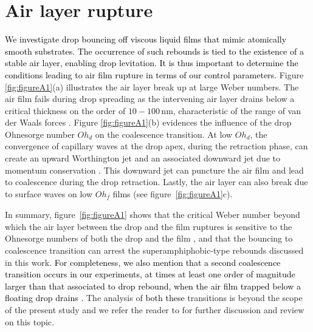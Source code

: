 \documentclass[]{jfm}
\newcommand{\revRev}[1]{\textcolor{black}{#1}}
\newcommand{\Ohd}{\mathit{Oh}_\mathit{d}}
\newcommand{\Ohf}{\mathit{Oh}_\mathit{f}}
\begin{document}
\section{Air layer rupture}
\label{App:FilmRupture}
%
\revRev{We investigate drop bouncing off viscous liquid films that mimic atomically smooth substrates. The occurrence of such rebounds is tied to the existence of a stable air layer, enabling drop levitation. It is thus important to determine the conditions leading to air film rupture in terms of our control parameters.}
Figure \ref{fig:figureA1}(a) illustrates the air layer break up at large Weber numbers. The air film fails during drop spreading as the intervening air layer drains below a critical thickness on the order of $10 - 100\,\si{\nano\meter}$, characteristic of the range of van der Waals forces \citep{charles1960coalescence, SprittlesPhysRevLett.124.084501, zhang2021thin}.
Figure \ref{fig:figureA1}(b) evidences the influence of the drop Ohnesorge number $\Ohd$ on the coalescence transition. 
At low $\Ohd$, the convergence of capillary waves at the drop apex, during the retraction phase, can create an upward Worthington jet and an associated downward jet due to momentum conservation \citep{Bartolo2006Singular,lee2020downward,zhang2022impact}. 
This downward jet can puncture the air film and lead to coalescence during the drop retraction.
Lastly, the air layer can also break due to surface waves on low $\Ohf$ films (see figure~\ref{fig:figureA1}c). 

In summary, figure~\ref{fig:figureA1} shows that the critical Weber number beyond which the air layer between the drop and the film ruptures is sensitive to the Ohnesorge numbers of both the drop and the film \citep{tang2016nonmonotonic, tang2018bouncing}, and that the bouncing to coalescence transition can arrest the superamphiphobic-type rebounds discussed in this work.
\revRev{For completeness, we also mention that a second coalescence transition occurs in our experiments, at times at least one order of magnitude larger than that associated to drop rebound, when the air film trapped below a floating drop drains \citep{lo2017mechanism,duchemin2020dimple}.}
The analysis of \revRev{both these} transitions is beyond the scope of the present study and we refer the reader to \citet{lohse-2020-pnas, SprittlesPhysRevLett.124.084501} for further discussion and review on this topic.
\end{document}
